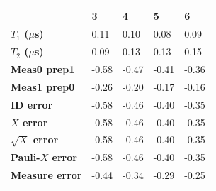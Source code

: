 \begin{tabular}{lllll}
\toprule
 & 3 & 4 & 5 & 6 \\
\midrule
\textbf{$T_1$ ($\mu$s)} & 0.11 & 0.10 & 0.08 & 0.09 \\
\textbf{$T_2$ ($\mu$s)} & 0.09 & 0.13 & 0.13 & 0.15 \\
\textbf{Meas0 prep1} & -0.58 & -0.47 & -0.41 & -0.36 \\
\textbf{Meas1 prep0} & -0.26 & -0.20 & -0.17 & -0.16 \\
\textbf{ID error} & -0.58 & -0.46 & -0.40 & -0.35 \\
\textbf{$X$ error} & -0.58 & -0.46 & -0.40 & -0.35 \\
\textbf{$\sqrt{X}$ error} & -0.58 & -0.46 & -0.40 & -0.35 \\
\textbf{Pauli-$X$ error} & -0.58 & -0.46 & -0.40 & -0.35 \\
\textbf{Measure error} & -0.44 & -0.34 & -0.29 & -0.25 \\
\bottomrule
\end{tabular}
